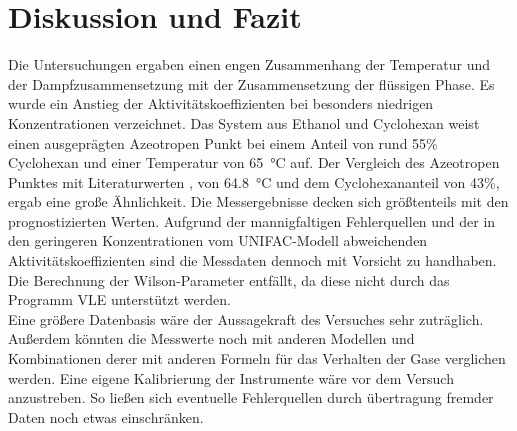 \section{Diskussion und Fazit}
\label{sec:diskussion}
Die Untersuchungen ergaben einen engen Zusammenhang der Temperatur und der Dampfzusammensetzung mit der Zusammensetzung der flüssigen Phase. Es wurde ein Anstieg der Aktivitätskoeffizienten bei besonders niedrigen Konzentrationen verzeichnet. Das System aus Ethanol und Cyclohexan weist einen ausgeprägten Azeotropen Punkt bei einem Anteil von rund 55\% Cyclohexan und einer Temperatur von \SI{65}{\degreeCelsius} auf. Der Vergleich des Azeotropen Punktes mit Literaturwerten \cite{azeotrop1}\cite{azeotrop2}, von \SI{64,8}{\degreeCelsius} und dem Cyclohexananteil von 43\%, ergab eine große Ähnlichkeit. Die Messergebnisse decken sich größtenteils mit den prognostizierten Werten. Aufgrund der mannigfaltigen Fehlerquellen und der in den geringeren Konzentrationen vom  UNIFAC-Modell abweichenden Aktivitätskoeffizienten sind die Messdaten dennoch mit Vorsicht zu handhaben. Die Berechnung der Wilson-Parameter entfällt, da diese nicht durch das Programm VLE unterstützt werden. \\
Eine größere Datenbasis wäre der Aussagekraft des Versuches sehr zuträglich. Außerdem könnten die Messwerte noch mit anderen Modellen und Kombinationen derer mit anderen Formeln für das Verhalten der Gase verglichen werden. Eine eigene Kalibrierung der Instrumente wäre vor dem Versuch anzustreben. So ließen sich eventuelle Fehlerquellen durch übertragung fremder Daten noch etwas einschränken. 

